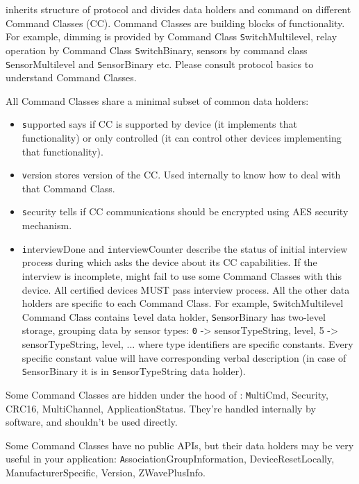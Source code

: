 \zway inherits structure of \zwave protocol and divides data holders and command on 
different Command Classes (CC). Command Classes are building blocks of \zwave functionality.
For example, dimming is provided by Command Class {\texttt SwitchMultilevel}, relay 
operation by Command Class {\texttt SwitchBinary}, sensors by command class 
{\texttt SensorMultilevel} and {\texttt SensorBinary} etc. Please consult \zwave 
protocol basics to understand \zwave Command Classes.

All Command Classes share a minimal subset of common data holders:

\begin{itemize}
\item {\texttt supported} says if CC is supported by device (it implements that 
functionality) or only controlled (it can control other devices implementing that 
functionality).
\item {\texttt version} stores version of the CC. Used internally to know how to deal 
with that Command Class.
\item {\texttt security} tells if CC communications should be encrypted using \zwave 
AES security mechanism.
\item {\texttt interviewDone} and {\texttt interviewCounter} describe the status of 
initial interview process during which \zway asks the device about its CC capabilities. 
If the interview is incomplete, \zway might fail to use some Command Classes with this 
device. All \zwave certified devices MUST pass interview process.
All the other data holders are specific to each Command Class. For example, 
{\texttt SwitchMultilevel Command Class} contains {\texttt level} data holder, 
{\texttt SensorBinary} has two-level storage, grouping data by sensor types:
{\texttt  0 -> {sensorTypeString, level}, 5 -> {sensorTypeString, level}, ... }
where type identifiers are \zwave specific constants. Every \zwave specific constant 
value will have corresponding verbal description (in case of {\texttt SensorBinary} it is in 
{\texttt sensorTypeString} data holder).
\end{itemize}

Some Command Classes are hidden under the hood of \zway: 
{\texttt MultiCmd, Security, CRC16, MultiChannel, ApplicationStatus}. They're handled 
internally by \zway software, and shouldn't be used directly.

Some Command Classes have no public APIs, but their data holders may be very useful 
in your application: {\texttt AssociationGroupInformation, DeviceResetLocally, ManufacturerSpecific, 
Version, ZWavePlusInfo}.

